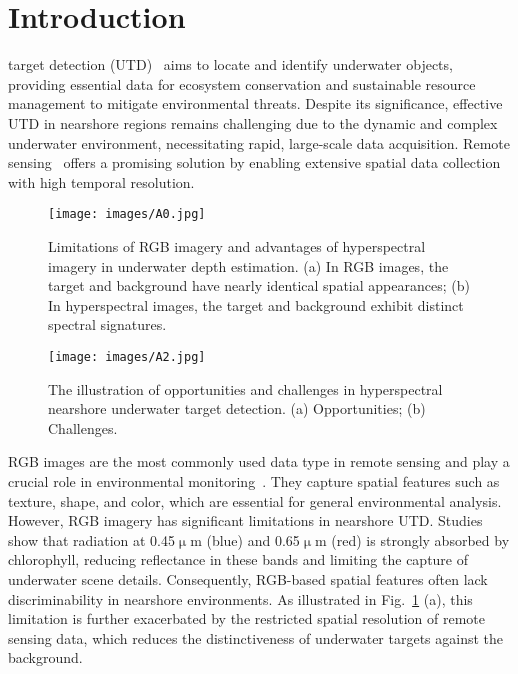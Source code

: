 \section{Introduction}\label{sec:1} 
 target detection (UTD)~\cite{Liu2024,Zhang2023,Li2023} aims to locate and identify underwater objects, providing essential data for ecosystem conservation and sustainable resource management to mitigate environmental threats.  
Despite its significance, effective UTD in nearshore regions remains challenging due to the dynamic and complex underwater environment, necessitating rapid, large-scale data acquisition.  
Remote sensing~\cite{8697135, 9174822} offers a promising solution by enabling extensive spatial data collection with high temporal resolution.  
\par
\begin{figure}[!t]                 
    \centering                    
    \texttt{[image: images/A0.jpg]}                     
    \caption{Limitations of RGB imagery and advantages of hyperspectral imagery in underwater depth estimation. (a) In RGB images, the target and background have nearly identical spatial appearances; (b) In hyperspectral images, the target and background exhibit distinct spectral signatures.}                  
    \label{fig:A0}   
\end{figure} 
\begin{figure*}[!t]                 
    \centering                    
    \texttt{[image: images/A2.jpg]}                     
    \caption{The illustration of opportunities and challenges in hyperspectral nearshore underwater target detection. (a) Opportunities; (b) Challenges.}                  
    \label{fig:A1}    
\end{figure*} 
RGB images are the most commonly used data type in remote sensing and play a crucial role in environmental monitoring~\cite{Ma2019}.  
They capture spatial features such as texture, shape, and color, which are essential for general environmental analysis.  
However, RGB imagery has significant limitations in nearshore UTD.  
Studies~\cite{10704737,10336777} show that radiation at 0.45$\upmu$m (blue) and 0.65$\upmu$m (red) is strongly absorbed by chlorophyll, reducing reflectance in these bands and limiting the capture of underwater scene details.  
Consequently, RGB-based spatial features often lack discriminability in nearshore environments.  
As illustrated in Fig.~\ref{fig:A0} (a), this limitation is further exacerbated by the restricted spatial resolution of remote sensing data, which reduces the distinctiveness of underwater targets against the background.  
